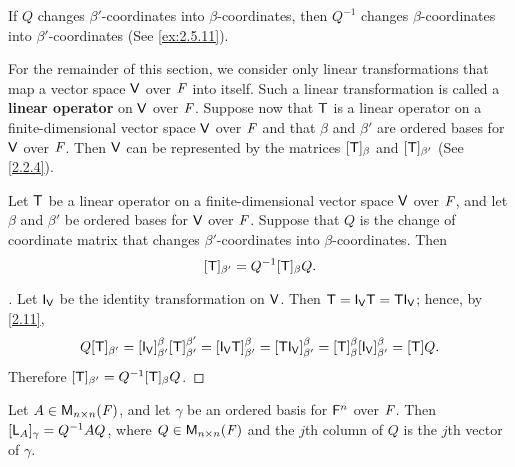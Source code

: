 \begin{note}
	If \(Q\) changes \(\beta'\)-coordinates into \(\beta\)-coordinates, then \(Q^{-1}\) changes \(\beta\)-coordinates into \(\beta'\)-coordinates
	(See \cref{ex:2.5.11}).
\end{note}

\begin{defn}\label{2.5.2}
	For the remainder of this section, we consider only linear transformations that map a vector space \(\mathsf{V}\) over \(\mathit{F}\) into itself.
	Such a linear transformation is called a \textbf{linear operator} on \(\mathsf{V}\) over \(\mathit{F}\).
	Suppose now that \(\mathsf{T}\) is a linear operator on a finite-dimensional vector space \(\mathsf{V}\) over \(\mathit{F}\) and that \(\beta\) and \(\beta'\) are ordered bases for \(\mathsf{V}\) over \(\mathit{F}\).
	Then \(\mathsf{V}\) can be represented by the matrices \([\mathsf{T}]_{\beta}\) and \([\mathsf{T}]_{\beta'}\)
	(See \cref{2.2.4}).
\end{defn}

\begin{thm}\label{2.23}
	Let \(\mathsf{T}\) be a linear operator on a finite-dimensional vector space \(\mathsf{V}\) over \(\mathit{F}\), and let \(\beta\) and \(\beta'\) be ordered bases for \(\mathsf{V}\) over \(\mathit{F}\).
	Suppose that \(Q\) is the change of coordinate matrix that changes \(\beta'\)-coordinates into \(\beta\)-coordinates.
	Then
	\[
		[\mathsf{T}]_{\beta'} = Q^{-1} [\mathsf{T}]_{\beta} Q.
	\]
\end{thm}

\begin{proof}[]
	Let \(\IT[\V]\) be the identity transformation on \(\mathsf{V}\).
	Then \(\T = \IT[\V] \T = \T \IT[\V]\);
	hence, by \cref{2.11},
	\[
		Q [\T]_{\beta'} = [\IT[\V]]_{\beta'}^{\beta} [\T]_{\beta'}^{\beta'} = [\IT[\V] \T]_{\beta'}^{\beta} = [\T \IT[\V]]_{\beta'}^{\beta} = [\T]_{\beta}^{\beta} [\IT[\V]]_{\beta'}^{\beta} = [\T] Q.
	\]
	Therefore \([\mathsf{T}]_{\beta'} = Q^{-1} [\mathsf{T}]_{\beta} Q\).
\end{proof}

\begin{cor}\label{2.5.3}
	Let \(A \in \mathsf{M}_{{n} \times n}({\mathit{F}})\), and let \(\gamma\) be an ordered basis for \(\mathsf{F}^n\) over \(\mathit{F}\).
	Then \([\mathsf{L}_A]_{\gamma} = Q^{-1} A Q\), where \(Q \in \mathsf{M}_{{n} \times n}({\mathit{F}})\) and the \(j\)th column of \(Q\) is the \(j\)th vector of \(\gamma\).
\end{cor}

